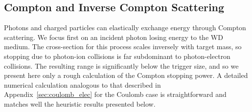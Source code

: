 \subsection{Compton and Inverse Compton Scattering}
\label{sec:compton}

Photons and charged particles can elastically exchange energy through Compton scattering.
We focus first on an incident photon losing energy to the WD medium.
The cross-section for this process scales inversely with target mass, so stopping due to photon-ion collisions is far subdominant to photon-electron collisions.
The resulting range is significantly below the trigger size, and so we present here only a rough calculation of the Compton stopping power. 
A detailed numerical calculation analogous to that described in Appendix~\ref{sec:coulomb_elec} for the Coulomb case is straightforward and matches well the heuristic results presented below. 

